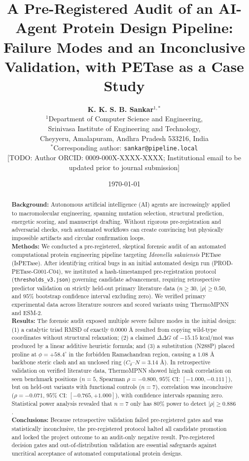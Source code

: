\documentclass[11pt,a4paper]{article}
\title{\textbf{A Pre-Registered Audit of an AI-Agent Protein Design Pipeline: Failure Modes and an Inconclusive Validation, with PETase as a Case Study}}
\author{
    \textbf{K. K. S. B. Sankar}$^{1,*}$ \\[0.5em]
    $^{1}$Department of Computer Science and Engineering, \\
    Srinivasa Institute of Engineering and Technology, \\
    Cheyyeru, Amalapuram, Andhra Pradesh 533216, India \\
    $^{*}$Corresponding author: \texttt{sankar@pipeline.local} \\[0.3em]
    \small{[TODO: Author ORCID: 0009-000X-XXXX-XXXX; Institutional email to be updated prior to journal submission]}
}
\date{\today}
\begin{document}
\maketitle

\begin{abstract}
\textbf{Background:} Autonomous artificial intelligence (AI) agents are increasingly applied to macromolecular engineering, spanning mutation selection, structural prediction, energetic scoring, and manuscript drafting. Without rigorous pre-registration and adversarial checks, such automated workflows can create convincing but physically impossible artifacts and circular confirmation loops. \\
\textbf{Methods:} We conducted a pre-registered, skeptical forensic audit of an automated computational protein engineering pipeline targeting \textit{Ideonella sakaiensis} PETase (IsPETase). After identifying critical bugs in an initial automated design run (PROD-PETase-G001-C04), we instituted a hash-timestamped pre-registration protocol (\texttt{thresholds\_v3.json}) governing candidate advancement, requiring retrospective predictor validation on strictly held-out primary literature data ($n \geq 30$, $|\rho| \geq 0.50$, and $95\%$ bootstrap confidence interval excluding zero). We verified primary experimental data across literature sources and scored variants using ThermoMPNN and ESM-2. \\
\textbf{Results:} The forensic audit exposed multiple severe failure modes in the initial design: (1) a catalytic triad RMSD of exactly $0.0000\text{ \AA}$ resulted from copying wild-type coordinates without structural relaxation; (2) a claimed $\Delta\Delta G$ of $-15.15\text{ kcal/mol}$ was produced by a linear additive heuristic formula; and (3) a substitution (N288P) placed proline at $\phi = +58.4^\circ$ in the forbidden Ramachandran region, causing a $1.08\text{ \AA}$ backbone steric clash and an unclosed ring ($C_\delta\text{--}N = 3.14\text{ \AA}$). In retrospective validation on verified literature data, ThermoMPNN showed high rank correlation on seen benchmark positions ($n=5$, Spearman $\rho = -0.800$, $95\%\text{ CI: } [-1.000, -0.111]$), but on held-out variants with functional controls ($n=7$), correlation was inconclusive ($\rho = -0.071$, $95\%\text{ CI: } [-0.765, +1.000]$), with confidence intervals spanning zero. Statistical power analysis revealed that $n=7$ only has $80\%$ power to detect $|\rho| \geq 0.886$. \\
\textbf{Conclusions:} Because retrospective validation failed pre-registered gates and was statistically inconclusive, the pre-registered protocol halted all candidate promotion and locked the project outcome to an audit-only negative result. Pre-registered decision gates and out-of-distribution validation are essential safeguards against uncritical acceptance of automated computational protein designs.
\end{abstract}
\end{document}
